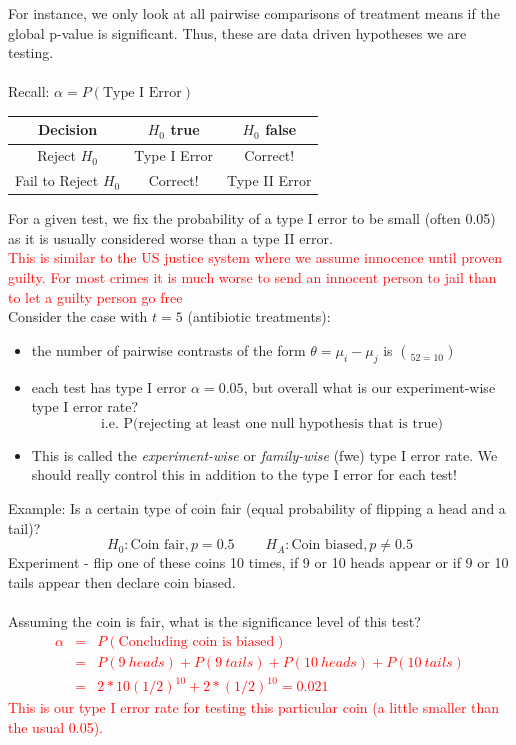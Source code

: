 For instance, we only look at all pairwise comparisons of treatment means if the global p-value is significant.  Thus, these are data driven hypotheses we are testing.  \\~\\

Recall: $\alpha=P(\mbox{Type I Error})$\\
\begin{center}
\begin{tabular}{c|cc}
Decision & $H_0$ true & $H_0$ false\\\hline
Reject $H_0$ & Type I Error & Correct! \\
Fail to Reject $H_0$ & Correct! & Type II Error
\end{tabular}
\end{center}

For a given test, we fix the probability of a type I error to be small (often 0.05) as it is usually considered worse than a type II error.\\
\textcolor{red}{This is similar to the US justice system where we assume innocence until proven guilty.  For most crimes it is much worse to send an innocent person to jail than to let a guilty person go free}\\
Consider the case with $t=5$ (antibiotic treatments): 
\begin{itemize}
\item the number of pairwise contrasts of the form $\theta=\mu_i-\mu_j$ is $\choose{5}{2}=10$
\item each test has type I error $\alpha=0.05$, but overall what is our experiment-wise type I error rate?
$$\mbox{i.e. P(rejecting at least one null hypothesis that is true)}$$
\item This is called the \textit{experiment-wise} or \textit{family-wise} (fwe) type I error rate.  We should really control this in addition to the type I error for each test!
\end{itemize}

Example:  Is a certain type of coin fair (equal probability of flipping a head and a tail)?
$$H_0: \mbox{Coin fair}, p=0.5~~~~~~~~~~H_A:\mbox{Coin biased}, p\neq 0.5$$
Experiment - flip one of these coins 10 times, if 9 or 10  heads appear or if 9 or 10 tails appear then declare coin biased.\\~\\
Assuming the coin is fair, what is the significance level of this test?\\
\textcolor{red}{
\begin{eqnarray*}
\alpha & = & P(\mbox{Concluding coin is biased})\\
 & = & P(9~heads)+P(9~tails)+P(10~heads)+P(10~tails)\\
& = & 2*10(1/2)^{10}+2*(1/2)^{10}=0.021
\end{eqnarray*}
This is our type I error rate for testing this particular coin (a little smaller than the usual 0.05).}

